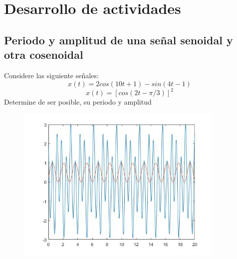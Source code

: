 \documentclass[12pt]{article}
\begin{document}
	\section{Desarrollo de actividades}
	\newpage
	\subsection{Periodo y amplitud de una señal senoidal y otra cosenoidal}
	Considere las siguiente señales:
	\begin{equation}
		x(t) = 2cos(10t+1)-sin(4t-1)
	\end{equation}
	\begin{equation}
		x(t) = [cos(2t- \pi/3)]^2
	\end{equation}
	Determine de ser posible, su periodo y amplitud
	
	\begin{figure}[h]
		\centering
		\includegraphics[width=10cm]{6_1.jpg}
	\end{figure}
	\newpage
\end{document}
